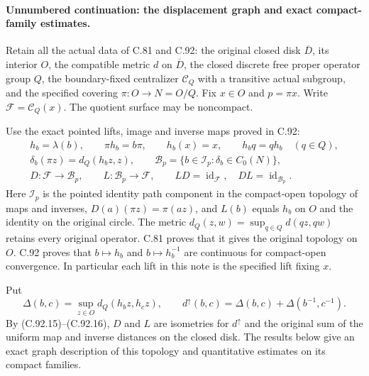 \documentclass[11pt,a4paper]{article}
\DeclareMathOperator{\id}{id}\DeclareMathOperator{\im}{im}
\begin{document}
\paragraph{Unnumbered continuation: the displacement graph and exact compact-family estimates.}
Retain all the actual data of C.81 and C.92: the original closed disk
$\overline D$, its interior $O$, the compatible metric $d$ on
$\overline D$, the closed discrete free proper operator group $Q$,
the boundary-fixed centralizer $\mathscr C_Q$ with a transitive actual
subgroup, and the specified covering $\pi:O\to N=O/Q$.
Fix $x\in O$ and $p=\pi x$. Write $\mathscr F=\mathscr C_Q(x)$.
The quotient surface may be noncompact.

Use the exact pointed lifts, image and inverse maps proved in C.92:
\[
\begin{gathered}
 h_b=\lambda(b),\qquad \pi h_b=b\pi,\qquad h_b(x)=x,
 \qquad h_bq=qh_b\quad(q\in Q),\\
 \delta_b(\pi z)=d_Q(h_bz,z),\qquad
 \mathscr B_p=\{b\in\mathscr I_p:\delta_b\in C_0(N)\},\\
 D:\mathscr F\longrightarrow\mathscr B_p,\qquad
 L:\mathscr B_p\longrightarrow\mathscr F,\qquad
 LD=\id_{\mathscr F},\quad DL=\id_{\mathscr B_p}.
\end{gathered}                                                  \tag{CFT.1}
\]
Here $\mathscr I_p$ is the pointed identity path component in the
compact-open topology of maps and inverses, $D(a)(\pi z)=\pi(az)$,
and $L(b)$ equals $h_b$ on $O$ and the identity on the original
circle. The metric $d_Q(z,w)=\sup_{q\in Q}d(qz,qw)$ retains every
original operator. C.81 proves that it gives the original topology
on $O$. C.92 proves that $b\mapsto h_b$ and $b\mapsto h_b^{-1}$
are continuous for compact-open convergence. In particular each
lift in this note is the specified lift fixing $x$.

Put
\[
 \Delta(b,c)=\sup_{z\in O}d_Q(h_bz,h_cz),\qquad
 d^\uparrow(b,c)=\Delta(b,c)+\Delta(b^{-1},c^{-1}).
                                                               \tag{CFT.2}
\]
By (C.92.15)--(C.92.16), $D$ and $L$ are isometries for
$d^\uparrow$ and the original sum of the uniform map and inverse
distances on the closed disk. The results below give an exact
graph description of this topology and quantitative estimates
on its compact families.
\end{document}
